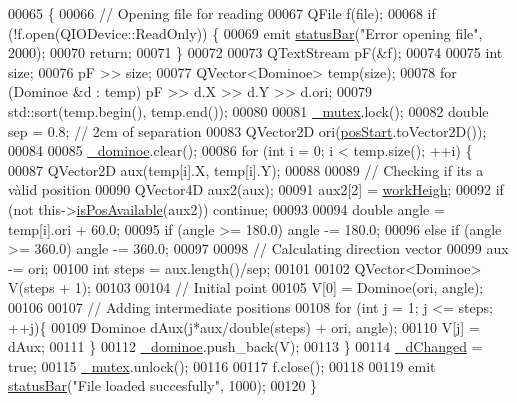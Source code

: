 \begin{DoxyCode}
00065 \{
00066     \textcolor{comment}{// Opening file for reading}
00067     QFile f(file);
00068     \textcolor{keywordflow}{if} (!f.open(QIODevice::ReadOnly)) \{
00069         emit \hyperlink{a00009_a3a3adc795d88624f86e13f2525e41106}{statusBar}(\textcolor{stringliteral}{"Error opening file"}, 2000);
00070         \textcolor{keywordflow}{return};
00071     \}
00072     
00073     QTextStream pF(&f);
00074     
00075     \textcolor{keywordtype}{int} size;
00076     pF >> size;
00077     QVector<Dominoe> temp(size);
00078     \textcolor{keywordflow}{for} (Dominoe &d : temp) pF >> d.X >> d.Y >> d.ori;
00079     std::sort(temp.begin(), temp.end());
00080     
00081     \hyperlink{a00009_a6327eafc0dac189ec1b202d63ef32457}{\_mutex}.lock();
00082     \textcolor{keywordtype}{double} sep = 0.8; \textcolor{comment}{// 2cm of separation}
00083     QVector2D ori(\hyperlink{a00009_a67cca86496c9826987f2c543adf788be}{posStart}.toVector2D());
00084     
00085     \hyperlink{a00009_ad06a87d9f22914fd2597c939a3eb61cd}{\_dominoe}.clear();
00086     \textcolor{keywordflow}{for} (\textcolor{keywordtype}{int} i = 0; i < temp.size(); ++i) \{
00087         QVector2D aux(temp[i].X, temp[i].Y);
00088         
00089         \textcolor{comment}{// Checking if its a vàlid position}
00090         QVector4D aux2(aux);
00091         aux2[2] = \hyperlink{a00009_a53758fdbbee450ab4cd5a3432725f056}{workHeigh};
00092         \textcolor{keywordflow}{if} (not this->\hyperlink{a00009_a6f6035054ecb8fe51bcdacae5da7cb0e}{isPosAvailable}(aux2)) \textcolor{keywordflow}{continue};
00093         
00094         \textcolor{keywordtype}{double} angle = temp[i].ori + 60.0;
00095         \textcolor{keywordflow}{if} (angle >= 180.0) angle -= 180.0;
00096         \textcolor{keywordflow}{else} \textcolor{keywordflow}{if} (angle >= 360.0) angle -= 360.0;
00097         
00098         \textcolor{comment}{// Calculating direction vector}
00099         aux -= ori;
00100         \textcolor{keywordtype}{int} steps = aux.length()/sep; 
00101         
00102         QVector<Dominoe> V(steps + 1);
00103         
00104         \textcolor{comment}{// Initial point}
00105         V[0] = Dominoe(ori, angle);
00106         
00107         \textcolor{comment}{// Adding intermediate positions}
00108         \textcolor{keywordflow}{for} (\textcolor{keywordtype}{int} j = 1; j <= steps; ++j)\{                
00109             Dominoe dAux(j*aux/\textcolor{keywordtype}{double}(steps) + ori, angle);
00110             V[j] = dAux;
00111         \}
00112         \hyperlink{a00009_ad06a87d9f22914fd2597c939a3eb61cd}{\_dominoe}.push\_back(V);
00113     \}
00114     \hyperlink{a00009_a2b6ccfeacbb3cc9ac5c34549b9aa3f11}{\_dChanged} = \textcolor{keyword}{true};
00115     \hyperlink{a00009_a6327eafc0dac189ec1b202d63ef32457}{\_mutex}.unlock();
00116     
00117     f.close();
00118     
00119     emit \hyperlink{a00009_a3a3adc795d88624f86e13f2525e41106}{statusBar}(\textcolor{stringliteral}{"File loaded succesfully"}, 1000);
00120 \}
\end{DoxyCode}
\hypertarget{a00009_a4f7371fed61d98cf6f128876e8fa518d}{}
